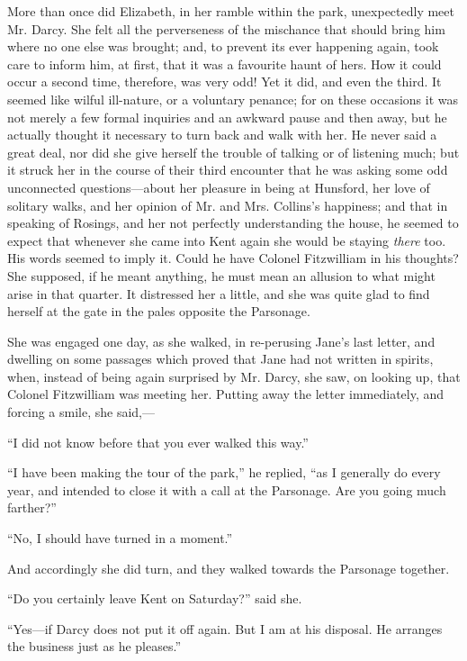 \documentclass[12pt]{book}
\begin{document}
More than once did Elizabeth, in her ramble within the park, unexpectedly meet Mr. Darcy. She felt all the perverseness of the mischance that should bring him where no one else was brought; and, to prevent its ever happening again, took care to inform him, at first, that it was a favourite haunt of hers. How it could occur a second time, therefore, was very odd! Yet it did, and even the third. It seemed like wilful ill-nature, or a voluntary penance; for on these occasions it was not merely a few formal inquiries and an awkward pause and then away, but he actually thought it necessary to turn back and walk with her. He never said a great deal, nor did she give herself the trouble of talking or of listening much; but it struck her in the course of their third encounter that he was asking some odd unconnected questions---about her pleasure in being at Hunsford, her love of solitary walks, and her opinion of Mr. and Mrs. Collins's happiness; and that in speaking of Rosings, and her not perfectly understanding the house, he seemed to expect that whenever she came into Kent again she would be staying \textit{there} too. His words seemed to imply it. Could he have Colonel Fitzwilliam in his thoughts? She supposed, if he meant anything, he must mean an allusion to what might arise in that quarter. It distressed her a little, and she was quite glad to find herself at the gate in the pales opposite the Parsonage.

She was engaged one day, as she walked, in re-perusing Jane's last letter, and dwelling on some passages which proved that Jane had not written in spirits, when, instead of being again surprised by Mr. Darcy, she saw, on looking up, that Colonel Fitzwilliam was meeting her. Putting away the letter immediately, and forcing a smile, she said,---

``I did not know before that you ever walked this way.''

``I have been making the tour of the park,'' he replied, ``as I generally do every year, and intended to close it with a call at the Parsonage. Are you going much farther?''

``No, I should have turned in a moment.''

And accordingly she did turn, and they walked towards the Parsonage together.

``Do you certainly leave Kent on Saturday?'' said she.

``Yes---if Darcy does not put it off again. But I am at his disposal. He arranges the business just as he pleases.''
\end{document}
